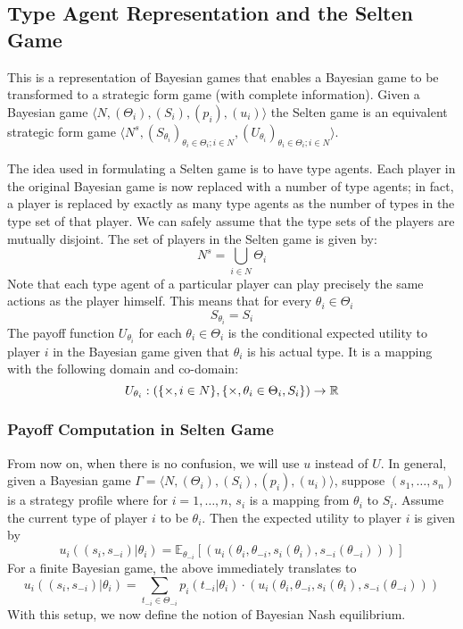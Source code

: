\subsection{Type Agent Representation and the Selten Game}
This is a representation of Bayesian games that enables a Bayesian game to be transformed to a strategic form game (with complete information).
Given a Bayesian game $\langle N,(\Theta_i),(S_i),(p_i),(u_i)\rangle$ the Selten game is an equivalent strategic form game $\langle N^s,(S_{\theta_i})_{\theta_i\in\Theta_{i};i\in N},(U_{\theta_i})_{\theta_i\in\Theta_{i};i\in N}\rangle$.

The idea used in formulating a Selten game is to have type agents.
Each player in the original Bayesian game is now replaced with a number of type agents; in fact, a player is replaced by exactly as many type agents as the number of types in the type set of that player.
We can safely assume that the type sets of the players are mutually disjoint.
The set of players in the Selten game is given by:
\[N^s=\bigcup_{i\in N}\Theta_i\]
Note that each type agent of a particular player can play precisely the same actions as the player himself.
This means that for every $\theta_i\in\Theta_{i}$
\[S_{\theta_i}=S_i\]
The payoff function $U_{\theta_i}$ for each $\theta_i\in\Theta_{i}$ is the conditional expected utility to player $i$ in the Bayesian game given that $\theta_i$ is his actual type.
It is a mapping with the following domain and co-domain:
\[U_{\theta_i}:\left(\{\times,i\in N\},\{\times,\theta_i\in\Theta_{i},S_i\}\right)\rightarrow\mathbb{R}\]
\subsubsection{Payoff Computation in Selten Game}
From now on, when there is no confusion, we will use $u$ instead of $U$.
In general, given a Bayesian game $\Gamma = \langle N,(\Theta_i),(S_i),(p_i),(u_i)\rangle$, suppose $(s_1,\ldots, s_n)$ is a strategy profile where for $i = 1,\ldots, n$, $s_i$ is a mapping from $\theta_i$ to $S_i$.
Assume the current type of player $i$ to be $\theta_i$.
Then the expected utility to player $i$ is given by
\[u_{i}((s_i,s_{-i})|\theta_i)=\mathbb{E}_{\theta_{-i}}[(u_i(\theta_i,\theta_{-i},s_i(\theta_i),s_{-i}(\theta_{-i})))]\]
For a finite Bayesian game, the above immediately translates to
\[u_{i}((s_i,s_{-i})|\theta_i)=\sum_{t_{-i}\in\Theta_{-i}}p_i(t_{-i}|\theta_i)\cdot(u_i(\theta_i,\theta_{-i},s_i(\theta_i),s_{-i}(\theta_{-i})))\]
With this setup, we now define the notion of Bayesian Nash equilibrium.
